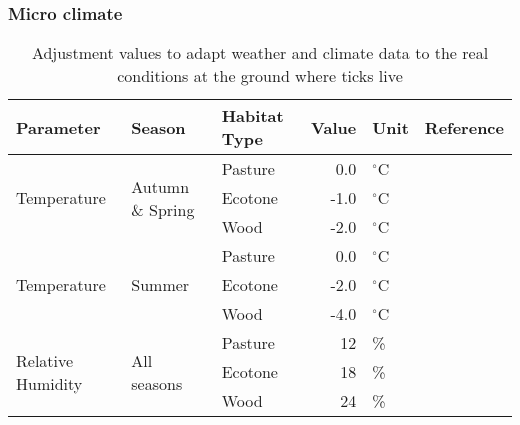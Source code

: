 \documentclass[a4paper, 11pt]{scrartcl}
\begin{document}
\subsubsection{Micro climate}

\begin{table}[h!]
\caption{Adjustment values to adapt weather and climate data to the real conditions at the ground where ticks live}
\label{tab:micro_climate_adjustments}
\begin{tabular}{@{}lllrll@{}}
\toprule
\textbf{Parameter}					& \textbf{Season} 					& \textbf{Habitat Type}  & \textbf{Value}  	& \textbf{Unit} & \textbf{Reference}  	\\
\midrule
\multirow{3}{*}{Temperature} 		& \multirow{3}{*}{Autumn \& Spring} & Pasture 				 &   0.0   			&   ${}^\circ$C	&            		    \\
									&									& Ecotone 				 &   -1.0 	  		&   ${}^\circ$C &	    				\\
									&					 				& Wood    				 &   -2.0   		&   ${}^\circ$C &	    				\\
\midrule
\multirow{3}{*}{Temperature} 		& \multirow{3}{*}{Summer}        	& Pasture 				 &   0.0    		&	${}^\circ$C	&          				\\
									&				 	 				& Ecotone 				 &  -2.0    		&  	${}^\circ$C	& ~\cite{Geiger.1995}  	\\
									&				 	 				& Wood	   				 &  -4.0    		&  	${}^\circ$C	& ~\cite{Bonan.2016}   	\\
\midrule
\multirow{3}{*}{Relative Humidity}  & \multirow{3}{*}{All seasons}      & Pasture 				 &   12   			&  	\%			&            		    \\
									&				 					& Ecotone 				 &   18    			&   \%    		&					    \\
									&				 					& Wood    				 &   24    			&  	\%			& ~\cite{Boehnke.2017} 	\\
\bottomrule
\end{tabular}
\end{table}



\newpage
\printbibliography[heading = bibintoc, title = {Bibliography}]
\end{document}
